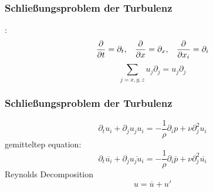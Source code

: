 \documentclass[12pt,t]{beamer}
\begin{document}
\begin{frame}
	\frametitle{Schließungsproblem der Turbulenz}
			:
\begin{equation}
\frac{\partial}{\partial t} = \partial_t, \hspace{0.3 cm}\frac{\partial}{\partial x} = \partial_x,\hspace{0.3 cm} \frac{\partial}{\partial x_i} = \partial_i
\end{equation}
\begin{equation}
\sum_{j=x,y,z}u_j\partial_j = u_j\partial_j
\end{equation}
\end{frame}


\begin{frame}
\frametitle{Schließungsproblem der Turbulenz}
\begin{equation}
\partial_t u_i + \partial_j u_ju_i = -\frac{1}{\rho}\partial_i p + \nu\partial^2_j u_i
\end{equation}
gemitteltep equation:
\begin{equation}
\partial_t \overline{u_i} + \partial_j \overline{u_ju_i} = -\frac{1}{\rho}\partial_i \overline{p} + \nu\partial^2_j \overline{u_i}
\end{equation}
Reynolds Decomposition
\begin{equation}
u = \overline{u} + u'
\end{equation}
\end{frame}
\end{document}

